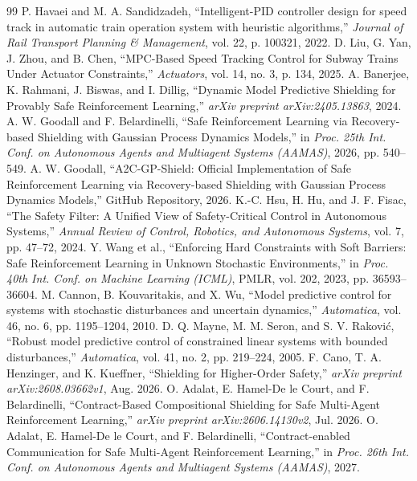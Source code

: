 \documentclass[10pt,a4paper]{article}
\begin{document}
\begin{thebibliography}{99}
\footnotesize
{} P. Havaei and M. A. Sandidzadeh, ``Intelligent-PID controller design for speed track in automatic train operation system with heuristic algorithms,'' \emph{Journal of Rail Transport Planning \& Management}, vol. 22, p. 100321, 2022.
 D. Liu, G. Yan, J. Zhou, and B. Chen, ``MPC-Based Speed Tracking Control for Subway Trains Under Actuator Constraints,'' \emph{Actuators}, vol. 14, no. 3, p. 134, 2025.
 A. Banerjee, K. Rahmani, J. Biswas, and I. Dillig, ``Dynamic Model Predictive Shielding for Provably Safe Reinforcement Learning,'' \emph{arXiv preprint arXiv:2405.13863}, 2024.
 A. W. Goodall and F. Belardinelli, ``Safe Reinforcement Learning via Recovery-based Shielding with Gaussian Process Dynamics Models,'' in \emph{Proc. 25th Int. Conf. on Autonomous Agents and Multiagent Systems (AAMAS)}, 2026, pp. 540--549.
 A. W. Goodall, ``A2C-GP-Shield: Official Implementation of Safe Reinforcement Learning via Recovery-based Shielding with Gaussian Process Dynamics Models,'' GitHub Repository, 2026.
 K.-C. Hsu, H. Hu, and J. F. Fisac, ``The Safety Filter: A Unified View of Safety-Critical Control in Autonomous Systems,'' \emph{Annual Review of Control, Robotics, and Autonomous Systems}, vol. 7, pp. 47--72, 2024.
 Y. Wang et al., ``Enforcing Hard Constraints with Soft Barriers: Safe Reinforcement Learning in Unknown Stochastic Environments,'' in \emph{Proc. 40th Int. Conf. on Machine Learning (ICML)}, PMLR, vol. 202, 2023, pp. 36593--36604.
 M. Cannon, B. Kouvaritakis, and X. Wu, ``Model predictive control for systems with stochastic disturbances and uncertain dynamics,'' \emph{Automatica}, vol. 46, no. 6, pp. 1195--1204, 2010.
 D. Q. Mayne, M. M. Seron, and S. V. Rakovi\'c, ``Robust model predictive control of constrained linear systems with bounded disturbances,'' \emph{Automatica}, vol. 41, no. 2, pp. 219--224, 2005.
 F. Cano, T. A. Henzinger, and K. Kueffner, ``Shielding for Higher-Order Safety,'' \emph{arXiv preprint arXiv:2608.03662v1}, Aug. 2026.
 O. Adalat, E. Hamel-De le Court, and F. Belardinelli, ``Contract-Based Compositional Shielding for Safe Multi-Agent Reinforcement Learning,'' \emph{arXiv preprint arXiv:2606.14130v2}, Jul. 2026.
 O. Adalat, E. Hamel-De le Court, and F. Belardinelli, ``Contract-enabled Communication for Safe Multi-Agent Reinforcement Learning,'' in \emph{Proc. 26th Int. Conf. on Autonomous Agents and Multiagent Systems (AAMAS)}, 2027.

\end{thebibliography}
\end{document}
